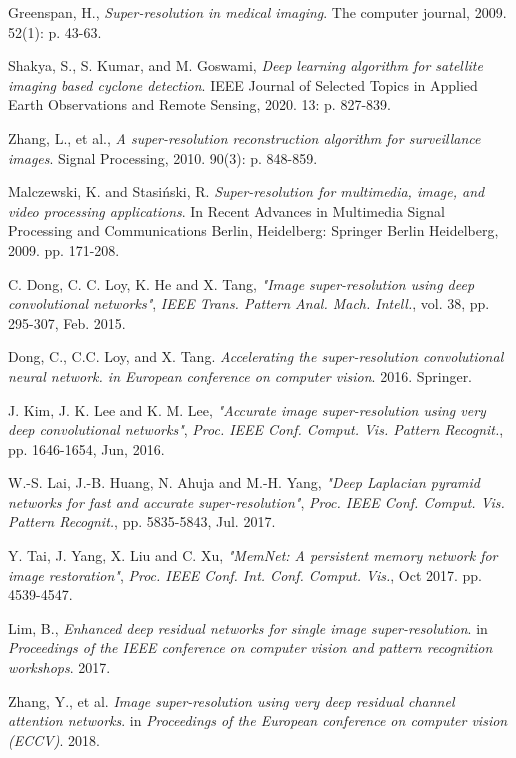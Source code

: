 \documentclass{ieeeaccess}
\begin{document}
\begin{thebibliography}{00}

 Greenspan, H., \textit{Super-resolution in medical imaging}. The computer journal, 2009. 52(1): p. 43-63.

 Shakya, S., S. Kumar, and M. Goswami, \textit{Deep learning algorithm for satellite imaging based cyclone detection}. IEEE Journal of Selected Topics in Applied Earth Observations and Remote Sensing, 2020. 13: p. 827-839.

 Zhang, L., et al., \textit{A super-resolution reconstruction algorithm for surveillance images}. Signal Processing, 2010. 90(3): p. 848-859.

 Malczewski, K. and Stasiński, R. \textit{Super-resolution for multimedia, image, and video processing applications}. In Recent Advances in Multimedia Signal Processing and Communications Berlin, Heidelberg: Springer Berlin Heidelberg, 2009. pp. 171-208.

 C. Dong, C. C. Loy, K. He and X. Tang, \textit{"Image super-resolution using deep convolutional networks"}, \textit{IEEE Trans. Pattern Anal. Mach. Intell.}, vol. 38, pp. 295-307, Feb. 2015.

 Dong, C., C.C. Loy, and X. Tang. \textit{Accelerating the super-resolution convolutional neural network. in European conference on computer vision}. 2016. Springer.

 J. Kim, J. K. Lee and K. M. Lee, \textit{"Accurate image super-resolution using very deep convolutional networks"}, \textit{Proc. IEEE Conf. Comput. Vis. Pattern Recognit.}, pp. 1646-1654, Jun, 2016.

 W.-S. Lai, J.-B. Huang, N. Ahuja and M.-H. Yang, \textit{"Deep Laplacian pyramid networks for fast and accurate super-resolution"}, \textit{Proc. IEEE Conf. Comput. Vis. Pattern Recognit.}, pp. 5835-5843, Jul. 2017.

 Y. Tai, J. Yang, X. Liu and C. Xu, \textit{"MemNet: A persistent memory network for image restoration"}, \textit{Proc. IEEE Conf. Int. Conf. Comput. Vis.}, Oct 2017. pp. 4539-4547. 

 Lim, B., \textit{Enhanced deep residual networks for single image super-resolution}. in \textit{Proceedings of the IEEE conference on computer vision and pattern recognition workshops}. 2017.

 Zhang, Y., et al. \textit{Image super-resolution using very deep residual channel attention networks}. in \textit{Proceedings of the European conference on computer vision (ECCV)}. 2018.


\end{thebibliography}
\end{document}
